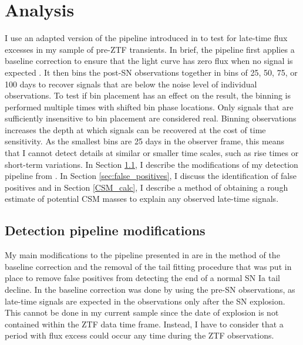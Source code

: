\documentclass[a4paper,oneside,12pt, class=Latex/Classes/PhDthesisPSnPDF, crop=false]{standalone}
\begin{document}
\section{Analysis}
\label{Pre-ZTF_analysis}
I use an adapted version of the pipeline introduced in \citet{Terwel_2024_paper1} to test for late-time flux excesses in my sample of pre-ZTF transients. In brief, the pipeline first applies a baseline correction to ensure that the light curve has zero flux when no signal is expected \citep[e.g.][]{Yao_baseline_corr,Miller_baseline_corr}. It then bins the post-SN observations together in bins of 25, 50, 75, or 100 days to recover signals that are below the noise level of individual observations. To test if bin placement has an effect on the result, the binning is performed multiple times with shifted bin phase locations. Only signals that are sufficiently insensitive to bin placement are considered real. Binning observations increases the depth at which signals can be recovered at the cost of time sensitivity. As the smallest bins are 25 days in the observer frame, this means that I cannot detect details at similar or smaller time scales, such as rise times or short-term variations. In Section \ref{sec:Pipeline_modifications}, I describe the modifications of my detection pipeline from \cite{Terwel_2024_paper1}. In Section \ref{sec:false_positives}, I discuss the identification of false positives and in Section \ref{CSM_calc}, I describe a method of obtaining a rough estimate of potential CSM masses to explain any observed late-time signals.

\subsection{Detection pipeline modifications}
\label{sec:Pipeline_modifications}
My main modifications to the pipeline presented in \citet{Terwel_2024_paper1} are in the method of the baseline correction and the removal of the tail fitting procedure that was put in place to remove false positives from detecting the end of a normal SN Ia tail decline. In \citet{Terwel_2024_paper1} the baseline correction was done by using the pre-SN observations, as late-time signals are expected in the observations only after the SN explosion. This cannot be done in my current sample since the date of explosion is not contained within the ZTF data time frame. Instead, I have to consider that a period with flux excess could occur any time during the ZTF observations. 
\end{document}
